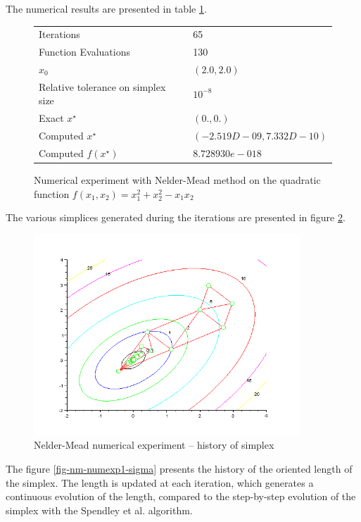 The numerical results are presented in table \ref{fig-nm-numexp1-table}.

\begin{figure}[htbp]
\begin{center}
\begin{tabular}{|l|l|}
\hline
Iterations & 65 \\
Function Evaluations & 130 \\
$x_0$ & $(2.0,2.0)$ \\
Relative tolerance on simplex size & $10^{-8}$ \\
Exact $x^\star$ & $(0.,0.)$\\
Computed $x^\star$ & $(-2.519D-09 , 7.332D-10)$\\
Computed $f(x^\star)$ & $8.728930e-018$\\
\hline
\end{tabular}
\end{center}
\caption{Numerical experiment with Nelder-Mead method on the quadratic function
$f(x_1,x_2) = x_1^2 + x_2^2 - x_1 x_2$}
\label{fig-nm-numexp1-table}
\end{figure}

The various simplices generated during the iterations are 
presented in figure \ref{fig-nm-numexp1-historysimplex}.

\begin{figure}
\begin{center}
\includegraphics[width=10cm]{quad2bis-nm-simplexcontours.png}
\end{center}
\caption{Nelder-Mead numerical experiment -- history of simplex}
\label{fig-nm-numexp1-historysimplex}
\end{figure}

The figure \ref{fig-nm-numexp1-sigma} presents the history of the oriented
length of the simplex. The length is updated at each iteration, which 
generates a continuous evolution of the length, compared to the 
step-by-step evolution of the simplex with the Spendley et al. algorithm.


